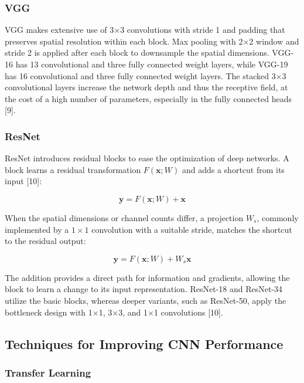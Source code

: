 \documentclass[11pt,a4paper]{article}
\begin{document}
\subsubsection{VGG}\label{theory:2.5.2}

VGG makes extensive use of 3\(\times\)3 convolutions with stride 1 and padding that preserves spatial resolution within each block. Max pooling with 2\(\times\)2 window and stride 2 is applied after each block to downsample the spatial dimensions. VGG-16 has 13 convolutional and three fully connected weight layers, while VGG-19 has 16 convolutional and three fully connected weight layers. The stacked 3\(\times\)3 convolutional layers increase the network depth and thus the receptive field, at the cost of a high number of parameters, especially in the fully connected heads [9].

\subsubsection{ResNet}\label{theory:2.5.3}

ResNet introduces residual blocks to ease the optimization of deep networks. A block learns a residual transformation \(F(\boldsymbol{x};W)\) and adds a shortcut from its input [10]:

\[
\boldsymbol{y}=F(\boldsymbol{x};W)+\boldsymbol{x}
\]

When the spatial dimensions or channel counts differ, a projection \({W}_{s}\), commonly implemented by a \(1\times 1\) convolution with a suitable stride, matches the shortcut to the residual output:

\[
\boldsymbol{y}=F(\boldsymbol{x};W)+{W}_{s}\boldsymbol{x}
\]

The addition provides a direct path for information and gradients, allowing the block to learn a change to its input representation. ResNet-18 and ResNet-34 utilize the basic blocks, whereas deeper variants, such as ResNet-50, apply the bottleneck design with 1\(\times\)1, 3\(\times\)3, and 1\(\times\)1 convolutions [10].

\subsection{Techniques for Improving CNN Performance}\label{theory:2.6}

\subsubsection{Transfer Learning}\label{theory:2.6.1}
\end{document}
